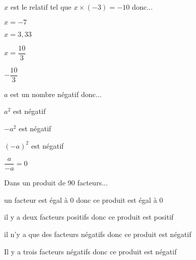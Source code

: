 \begin{QCM}
\begin{GroupeQCM}
\begin{exercice}
$x$ est le relatif tel que $x \times (-3) = -10$ donc...
\begin{ChoixQCM}{4}
\item $x = -7$
\item $x = 3,33$
\item $x=\dfrac{10}{3}$
\item $-\dfrac{10}{3}$
\end{ChoixQCM}
\begin{corrige}
\end{corrige}
\end{exercice}

\end{GroupeQCM}
\end{QCM}


\begin{QCM}
\begin{GroupeQCM}

\begin{exercice}
$a$ est un nombre négatif donc...
\begin{ChoixQCM}{4}
\item $a^2$ est négatif
\item $-a^2$ est négatif
\item $(-a)^2$ est négatif
\item $\dfrac{a}{-a}=0$
\end{ChoixQCM}
\begin{corrige}
\end{corrige}
\end{exercice}


\begin{exercice}
Dans un produit de 90 facteurs...
\begin{ChoixQCM}{4}
\item un facteur est égal à 0 donc ce produit est égal à 0
\item il y a deux  facteurs positifs donc ce produit est positif
\item il n'y a que des facteurs négatifs donc ce produit est négatif
\item Il y a trois facteurs négatifs donc ce produit est négatif
\end{ChoixQCM}
\begin{corrige}
\end{corrige}
\end{exercice}


\end{GroupeQCM}
\end{QCM}
